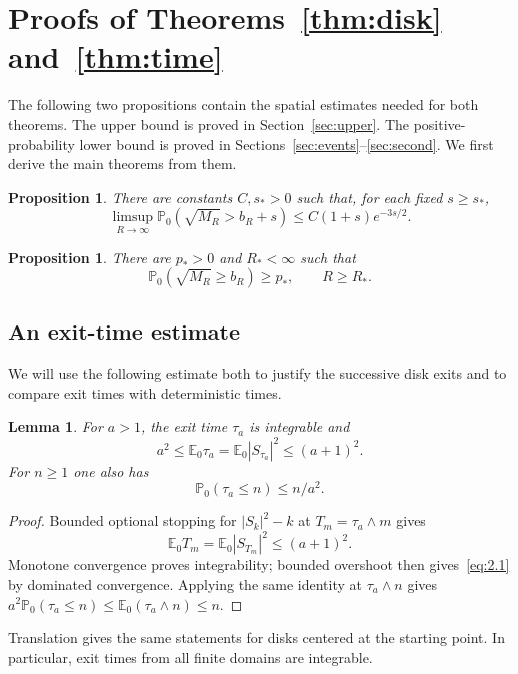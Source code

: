 \documentclass[11pt,letterpaper,reqno]{amsart}
\numberwithin{equation}{section}
\newtheorem{proposition}[theorem]{Proposition}
\newtheorem{lemma}[theorem]{Lemma}
\theoremstyle{remark}
\begin{document}
\section{Proofs of Theorems~\ref{thm:disk} and~\ref{thm:time}}\label{sec:mainproofs}
The following two propositions contain the spatial estimates needed for both theorems. The upper bound is proved in Section~\ref{sec:upper}. The positive-probability lower bound is proved in Sections~\ref{sec:events}--\ref{sec:second}. We first derive the main theorems from them.

\begin{proposition}\label{prop:upper}
There are constants $C,s_*>0$ such that, for each fixed $s\ge s_*$,
\[
\limsup_{R\to\infty}\mathbb P_0(\sqrt{M_R}>b_R+s)
\le C(1+s)e^{-3s/2}.
\]
\end{proposition}

\begin{proposition}\label{prop:seed}
There are $p_*>0$ and $R_*<\infty$ such that
\begin{equation}\label{eq:1.5}
\mathbb P_0(\sqrt{M_R}\ge b_R)\ge p_*,\qquad R\ge R_*.
\end{equation}
\end{proposition}

\subsection{An exit-time estimate}
We will use the following estimate both to justify the successive disk exits and to compare exit times with deterministic times.
\begin{lemma}\label{lem:exit}
For $a>1$, the exit time $\tau_a$ is integrable and
\begin{equation}\label{eq:2.1}
a^2\le\mathbb E_0\tau_a=\mathbb E_0|S_{\tau_a}|^2\le(a+1)^2.
\end{equation}
For $n\ge1$ one also has
\begin{equation}\label{eq:2.2}
\mathbb P_0(\tau_a\le n)\le n/a^2.
\end{equation}
\end{lemma}
\begin{proof}
Bounded optional stopping for $|S_k|^2-k$ at $T_m=\tau_a\wedge m$ gives
\begin{equation}\label{eq:2.3}
\mathbb E_0T_m=\mathbb E_0|S_{T_m}|^2\le(a+1)^2.
\end{equation}
Monotone convergence proves integrability; bounded overshoot then gives~\eqref{eq:2.1} by dominated convergence. Applying the same identity at $\tau_a\wedge n$ gives $a^2\mathbb P_0(\tau_a\le n)\le\mathbb E_0(\tau_a\wedge n)\le n$.
\end{proof}
Translation gives the same statements for disks centered at the starting point. In particular, exit times from all finite domains are integrable.
\end{document}
